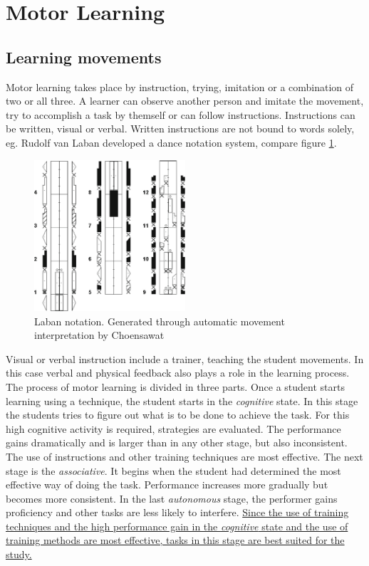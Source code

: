\section{Motor Learning}
\subsection{Learning movements}
Motor learning takes place by instruction, trying, imitation or a combination of two or all three. A learner can observe another person and imitate the movement, try to accomplish a task by themself or can follow instructions. Instructions can be written, visual or verbal. Written instructions are not bound to words solely, eg. Rudolf van Laban developed a dance notation system, compare figure \ref{fig:laban}.
\begin{figure}
	\centering
	\includegraphics[width=0.5\textwidth]{img/laban.png}
	\caption{Laban notation. Generated through automatic movement interpretation by Choensawat \cite{Choensawat2015}}
	\label{fig:laban}
\end{figure}
Visual or verbal instruction include a trainer, teaching the student movements. In this case verbal and physical feedback also plays a role in the learning process. The process of motor learning is divided in three parts. Once a student starts learning using a technique, the student starts in the \textit{cognitive} state. In this stage the students tries to figure out what is to be done to achieve the task. For this high cognitive activity is required, strategies are evaluated. The performance gains dramatically and is larger than in any other stage, but also inconsistent. The use of instructions and other training techniques are most effective. The next stage is the \textit{associative}. It begins when the student had determined the most effective way of doing the task. Performance increases more gradually but becomes more consistent. In the last \textit{autonomous} stage, the performer gains proficiency and other tasks are less likely to interfere. \underline{Since the use of training techniques and the high performance gain in the \textit{cognitive} state and the use of training methods are most effective, tasks in this stage are best suited for the study.}\\

